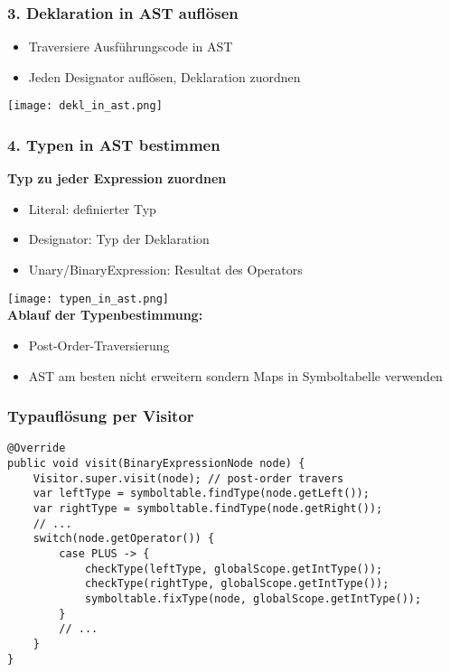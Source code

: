 \subsubsection{3. Deklaration in AST auflösen}
\begin{itemize}
    \item Traversiere Ausführungscode in AST
    \item Jeden Designator auflösen, Deklaration zuordnen
\end{itemize}
\texttt{[image: dekl\_in\_ast.png]}

\subsubsection{4. Typen in AST bestimmen}
\textbf{Typ zu jeder Expression zuordnen}
\begin{itemize}
    \item Literal: definierter Typ
    \item Designator: Typ der Deklaration
    \item Unary/BinaryExpression: Resultat des Operators
\end{itemize}
\texttt{[image: typen\_in\_ast.png]}\\
\textbf{Ablauf der Typenbestimmung:}
\begin{itemize}
    \item Post-Order-Traversierung
    \item AST am besten nicht erweitern sondern Maps in Symboltabelle verwenden
\end{itemize}
\subsubsection{Typauflösung per Visitor}
\begin{lstlisting}
@Override
public void visit(BinaryExpressionNode node) {
    Visitor.super.visit(node); // post-order travers
    var leftType = symboltable.findType(node.getLeft());
    var rightType = symboltable.findType(node.getRight());
    // ... 
    switch(node.getOperator()) {
        case PLUS -> {
            checkType(leftType, globalScope.getIntType());
            checkType(rightType, globalScope.getIntType());
            symboltable.fixType(node, globalScope.getIntType());
        }
        // ...
    }
}
\end{lstlisting}


